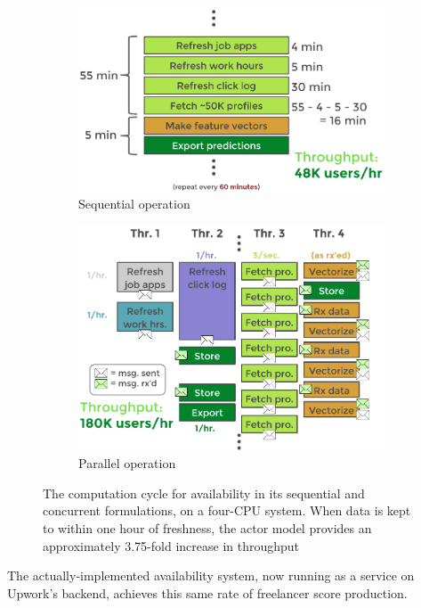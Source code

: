 \documentclass{article}
\begin{document}
\begin{figure}
\begin{subfigure}{.5\textwidth}
	\centering
	\includegraphics[width=.95\linewidth]{fig/tex/availability_serial.png}
	\caption{Sequential operation}
	\label{fig_avail_serial}
\end{subfigure}
\begin{subfigure}{.5\textwidth}
	\centering
	\includegraphics[width=.95\linewidth]{fig/tex/availability_concurrent.png}
	\caption{Parallel operation}
	\label{fig_avail_concur}
	\end{subfigure}
\caption{The computation cycle for availability in its sequential and concurrent
formulations, on a four-CPU system. When data is kept to within one hour of
freshness, the actor model provides an approximately 3.75-fold increase in
throughput}
\label{fig_avail_serial_concur}
\end{figure}

The actually-implemented availability system, now running as a service on 
Upwork's backend, achieves this same rate of freelancer score production.
\end{document}
